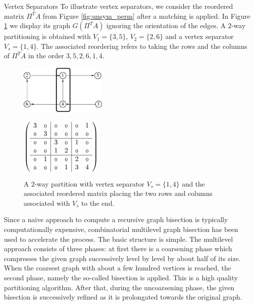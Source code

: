 \begin{example}{Vertex Separators}\label{exm:vsep}
To illustrate vertex separators, we consider the reordered matrix $\Pi^TA$
from Figure \ref{fig:unsym_perm} after a  matching is applied.
In Figure \ref{fig:matrixvertex} we display its graph $G(\Pi^T A)$ ignoring
the orientation of the edges. A 
$2$-way partitioning is obtained with $V_1 = \{3,5\}$, $V_2 = \{2,6\}$ and
a vertex separator $V_s = \{1,4\}$. The associated reordering
refers to taking the rows and the columns of $\Pi^T A$ in the order
$3,5,2,6,1,4$.
\end{example}
\begin{figure}%
 \centering
\begin{minipage}{.33\textwidth}
 \begin{center}
\includegraphics[width=4.2cm]{figures/matrixvertex}
 \end{center}
\end{minipage}
\begin{minipage}{.33\textwidth}
 \begin{center}
    $\left(
        \begin{array}{cc|cc|cc}
        3   & \scriptstyle{0} & \scriptstyle{0} & \scriptstyle{0} & \scriptstyle{0}   &  1  \\
        \scriptstyle{0} & 3   &  \scriptstyle{0}& \scriptstyle{0} & \scriptstyle{0} & \scriptstyle{0}   \\ \hline
        \scriptstyle{0} &  \scriptstyle{0}& 3   & \scriptstyle{0} &  1 & \scriptstyle{0} \\
        \scriptstyle{0} & \scriptstyle{0} &  1 &  2  & \scriptstyle{0}   & \scriptstyle{0} \\ \hline
        \scriptstyle{0}  & 1  & \scriptstyle{0} & \scriptstyle{0} & 2   & \scriptstyle{0}   \\
        \scriptstyle{0}   & \scriptstyle{0} & \scriptstyle{0} & 1   & 3 & 4   
        \end{array}
    \right)$
 \end{center}
\end{minipage}
\caption{A $2$-way partition with vertex separator $V_s=\{1,4\}$
and the associated reordered matrix placing the two rows and columns associated 
with $V_s$ to the end.}\label{fig:matrixvertex}
\end{figure}

Since a naive approach to compute a recursive graph bisection is 
typically computationally expensive,
combinatorial multilevel graph bisection has been used to
accelerate the process. The basic structure is simple. The multilevel approach
consists of three phases: at first there is a coarsening phase
which compresses the given graph successively
level by level by about half of its size. When the coarsest graph with about
a few hundred vertices is reached, the second phase,  namely the so-called
bisection is applied. This is a high quality partitioning algorithm.
After that, during the uncoarsening phase, the given
bisection is successively refined as it is prolongated towards the original
graph. 

